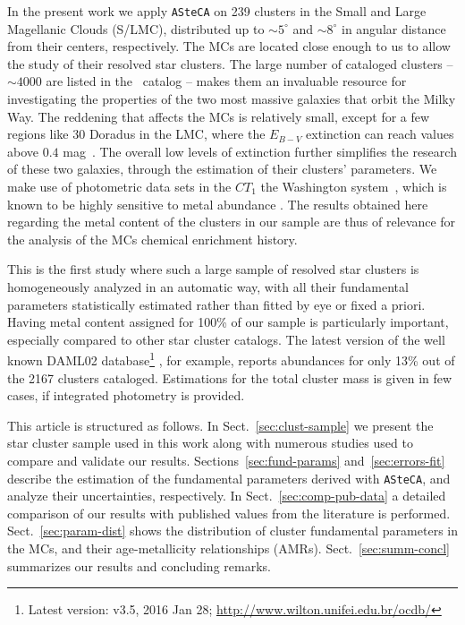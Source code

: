 \documentclass{aa}
\begin{document}
In the present work we apply \texttt{ASteCA} on 239 clusters in the Small and
Large Magellanic Clouds (S/LMC), distributed up to ${\sim}5^{\circ}$ and $
{\sim}8^{\circ}$ in angular distance from their centers, respectively.
%
The MCs are located close enough to us to allow the study of their resolved star
clusters. The large number of cataloged clusters -- $\sim4000$ are listed in
the~\cite{Bica_2008} catalog -- makes them an invaluable resource for
investigating the properties of the two most massive galaxies that orbit the
Milky Way.
%
The reddening that affects the MCs is relatively small, except for a few regions
like 30 Doradus in the LMC, where the $E_{B-V}$ extinction can reach values
above $0.4$ mag~\citep{Piatti_2015b}. The overall low levels of extinction
further simplifies the research of these two galaxies, through the estimation of
their clusters' parameters.
%
We make use of photometric data sets in the $CT_1$ the Washington
system~\citep{Canterna_1976,Geisler_1996}, which is known to be highly sensitive
to metal abundance \citep{Geisler_1999}.
The results obtained here regarding the metal content of the clusters in our
sample are thus of relevance for the analysis of the MCs chemical
enrichment history.

This is the first study where such a large sample of resolved star clusters is
homogeneously analyzed in an automatic way, with all their fundamental
parameters statistically estimated rather than fitted by eye or fixed a priori.
%
Having metal content assigned for 100\% of our sample is particularly
important, especially compared to other star cluster catalogs. The latest
version of the well known DAML02 database\footnote{Latest version: v3.5, 2016
Jan 28; \url{http://www.wilton.unifei.edu.br/ocdb/}}
\citep{Dias_2002}, for example, reports abundances for only 13\% out of the 2167
clusters cataloged. Estimations for the total cluster mass is given in few
cases, if integrated photometry is provided.

This article is structured as follows.
In Sect.~\ref{sec:clust-sample} we present the star cluster sample used in
this work along with numerous studies used to compare and validate our
results.
Sections~\ref{sec:fund-params} and~\ref{sec:errors-fit} describe the estimation
of the fundamental parameters derived with \texttt{ASteCA}, and analyze their
uncertainties, respectively.
In Sect.~\ref{sec:comp-pub-data} a detailed comparison of our results with
published values from the literature is performed.
Sect.~\ref{sec:param-dist} shows the distribution of cluster fundamental
parameters in the MCs, and their age-metallicity relationships (AMRs).
Sect.~\ref{sec:summ-concl} summarizes our results and concluding
remarks.
\end{document}

